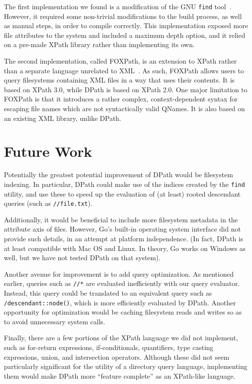 \documentclass{article}
\begin{document}
The first implementation we found is a modification of the GNU \texttt{find}
tool~\cite{other}. However, it required some non-trivial modifications to the
build process, as well as manual steps, in order to compile correctly. This
implementation exposed more file attributes to the system and included a maximum
depth option, and it relied on a pre-made XPath library rather than implementing
its own.

The second implementation, called FOXPath, is an extension to XPath rather than
a separate language unrelated to XML~\cite{foxpath}. As such, FOXPath allows
users to query filesystems containing XML files in a way that uses their
contents. It is based on XPath 3.0, while DPath is based on XPath 2.0. One major
limitation to FOXPath is that it introduces a rather complex, context-dependent
syntax for escaping file names which are not syntactically valid QNames. It is
also based on an existing XML library, unlike DPath.

\section{Future Work}
\label{sec:future}

Potentially the greatest potential improvement of DPath would be filesystem
indexing. In particular, DPath could make use of the indices created by the
\texttt{find} utility, and use these to speed up the evaluation of (at least)
rooted descendant queries (such as \texttt{//file.txt}).

Additionally, it would be beneficial to include more filesystem metadata in the
attribute axis of files. However, Go's built-in operating system interface did
not provide such details, in an attempt at platform independence. (In fact,
DPath is at least compatible with Mac OS and Linux. In theory, Go works on
Windows as well, but we have not tested DPath on that system).

Another avenue for improvement is to add query optimization. As mentioned
earlier, queries such as \texttt{//*} are evaluated inefficiently with our query
evaluator. Instead, this query could be translated to an equivalent query such
as \texttt{/descendant::node()}, which is more efficiently evaluated by DPath.
Another opportunity for optimization would be caching filesystem reads and
writes so as to avoid unnecessary system calls.

Finally, there are a few portions of the XPath language we did not implement,
such as for-return expressions, if-conditionals, quantifiers, type casting
expressions, union, and intersection operators. Although these did not seem
particularly significant for the utility of a directory query language,
implementing them would make DPath more ``feature complete'' as an XPath-like
language.
\end{document}
